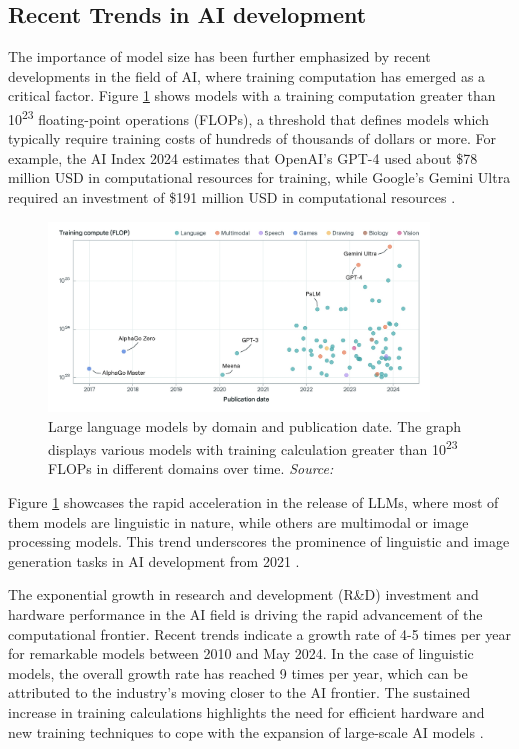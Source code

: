 \subsection{Recent Trends in AI development}

The importance of model size has been further emphasized by recent developments in the field of AI, where training computation has emerged as a critical factor. Figure \ref{fig:large-scale-models} shows models with a training computation greater than 10\textsuperscript{23} floating-point operations (FLOPs), a threshold that defines models which typically require training costs of hundreds of thousands of dollars or more. For example, the AI Index 2024 estimates that OpenAI's GPT-4 used about \$78 million USD in computational resources for training, while Google's Gemini Ultra required an investment of \$191 million USD in computational resources \cite{epoch2024trackinglargescaleaimodels, maslej2024ai}.

\begin{figure}[h!]
    \centering
    \includegraphics[width=0.9\textwidth]{images/llms/large-scale-models-by-domain-and-date.jpg}
    \caption{Large language models by domain and publication date. The graph displays various models with training calculation greater than 10\textsuperscript{23} FLOPs in different domains over time. \textit{Source:} \cite{epoch2024trackinglargescaleaimodels}}
    \label{fig:large-scale-models}
\end{figure}

Figure \ref{fig:large-scale-models} showcases the rapid acceleration in the release of LLMs, where most of them models are linguistic in nature, while others are multimodal or image processing models. This trend underscores the prominence of linguistic and image generation tasks in AI development from 2021 \cite{epoch2024trackinglargescaleaimodels}.

The exponential growth in research and development (R\&D) investment and hardware performance in the AI field is driving the rapid advancement of the computational frontier. Recent trends indicate a growth rate of 4-5 times per year for remarkable models between 2010 and May 2024. In the case of linguistic models, the overall growth rate has reached 9 times per year, which can be attributed to the industry's moving closer to the AI frontier. The sustained increase in training calculations highlights the need for efficient hardware and new training techniques to cope with the expansion of large-scale AI models \cite{epoch2024trainingcomputeoffrontieraimodelsgrowsby45xperyear}.

